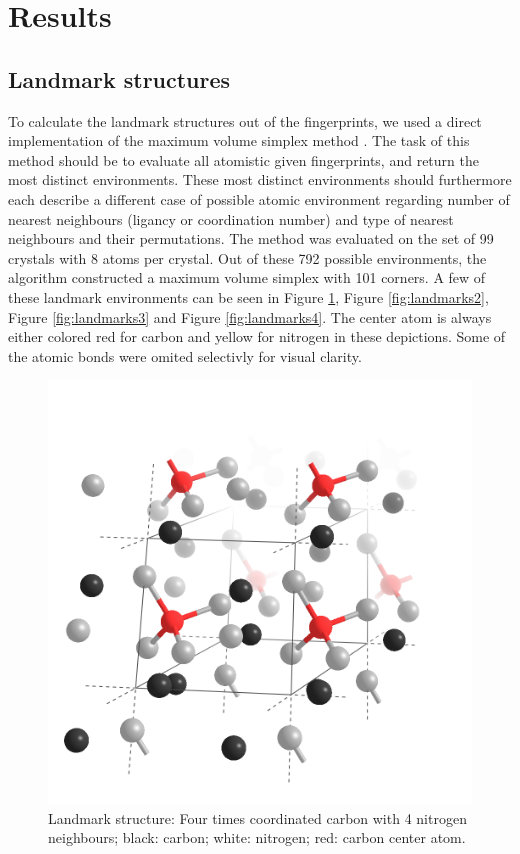 \newpage
\section{Results}
\subsection{Landmark structures}

To calculate the landmark structures out of the fingerprints, we used a direct implementation of the maximum volume simplex method \cite{Behnam2020}. The task of this method should be to evaluate all atomistic given fingerprints, and return the most distinct environments. These most distinct environments should furthermore each describe a different case of possible atomic environment regarding number of nearest neighbours (ligancy or coordination number) and type of nearest neighbours and their permutations. The method was evaluated on the set of 99 crystals with 8 atoms per crystal. Out of these 792 possible environments, the algorithm constructed a maximum volume simplex with 101 corners. A few of these landmark environments can be seen in Figure \ref{fig:landmarks1}, Figure \ref{fig:landmarks2}, Figure \ref{fig:landmarks3} and Figure \ref{fig:landmarks4}. The center atom is always either colored red for carbon and yellow for nitrogen in these depictions. Some of the atomic bonds were omited selectivly for visual clarity.


\begin{figure}[h!]

\center
\includegraphics[width=\linewidth]{Figures/landmark1.png}
\caption{Landmark structure: Four times coordinated carbon with 4 nitrogen neighbours; black: carbon; white: nitrogen; red: carbon center atom. }
\label{fig:landmarks1}
\end{figure}

